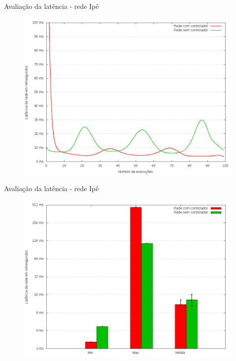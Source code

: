 \begin{frame}{Avaliação da latência - rede Ipê}

    \begin{figure}[!htb]
        \centering
        \includegraphics[scale=.35]{images/ipe-latency}
    \end{figure}
\end{frame}


\begin{frame}{Avaliação da latência - rede Ipê}

    \begin{figure}[!htb]
        \centering
        \includegraphics[scale=.35]{images/ipe-latency-stats}
    \end{figure}
\end{frame}


